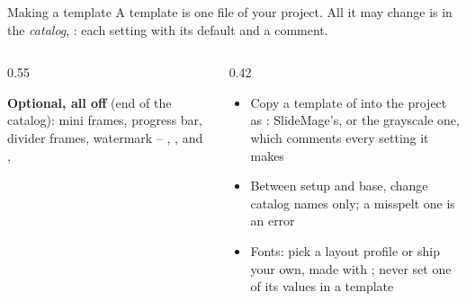 
\begin{standardframe}{Making a template}
	\small
	A template is one file of your project. All it may change is in the \emph{catalog},
	: each setting with its default and a comment.
	\par
	\begin{columns}[T,onlytextwidth]
		\begin{column}{0.55\linewidth}
			\par\smallskip
			{\footnotesize\textcolor{c_primary_highlight}{\textbf{Optional, all off}} (end of the catalog):
			mini frames, progress bar, divider frames, watermark -- ,
			,  and , \par}
		\end{column}
		\begin{column}{0.42\linewidth}
			\begin{itemize}
				\item Copy a template of  into the project as : SlideMage's, or the grayscale one, which comments every setting it makes
				\item Between setup and base, change catalog names only; a misspelt one is an error
				\item Fonts: pick a layout profile or ship your own, made with ; never set one of its values in a template
			\end{itemize}
		\end{column}
	\end{columns}
\end{standardframe}
